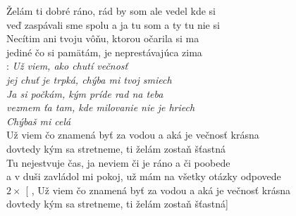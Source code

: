 
Želám ti dobré ráno, rád by som ale vedel kde si\\
veď zaspávali sme spolu 
a ja tu som a ty tu nie si\\

Necítim ani tvoju vôňu, ktorou očarila si ma\\ 
jediné čo si pamätám, je neprestávajúca zima\\ 

\textregistered: \emph{Už viem, ako chutí večnosť\\
jej chuť je trpká, chýba mi tvoj smiech\\
Ja si počkám, kým príde rad na teba\\
vezmem ťa tam, kde milovanie nie je hriech\\
Chýbaš mi celá}\\

Už viem čo znamená byť za vodou a aká je večnosť krásna\\
dovtedy kým sa stretneme, ti želám zostaň šťastná\\

Tu nejestvuje čas, ja neviem či je ráno a či poobede \\
a v duši zavládol mi pokoj, už mám na všetky otázky odpovede\\

$2\times$ [ \textregistered, Už viem čo znamená byť za vodou a aká je večnosť krásna\\
dovtedy kým sa stretneme, ti želám zostaň šťastná]


\newpage
